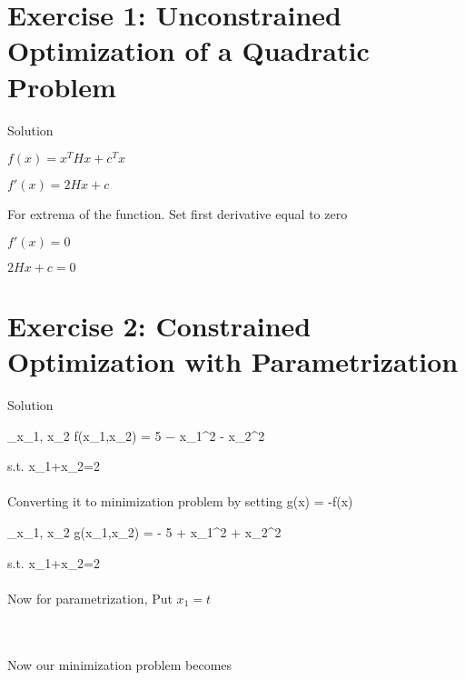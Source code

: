 \documentclass[unicode,11pt,a4paper,oneside,numbers=endperiod,openany]{scrartcl}
\begin{document}
\setassignment
{}


\section*{Exercise 1: Unconstrained Optimization of a Quadratic Problem}

{Solution}

${f(x) = x^THx + c^Tx}$

${f'(x) = 2Hx + c}$

{For extrema of the function. Set first derivative equal to zero}

${f'(x) = 0}$

${2Hx + c = 0}$


\section*{Exercise 2: Constrained Optimization with Parametrization}
{Solution}



{\max_{x_1, x_2} f(x_1,x_2) = 5 − {{x_1}^{2}} -  {  {x_2}^{2}}}

{s.t. x_1+x_2=2}\\~\\

{Converting it to minimization problem by setting g(x) = -f(x)}

{\min_{x_1, x_2} g(x_1,x_2) = - 5 + {{x_1}^{2}} + {  {x_2}^{2}}}

{s.t. x_1+x_2=2}\\~\\

{Now for parametrization, Put $x_1 = t$}



\\~\\

{Now our minimization problem becomes}
\end{document}
